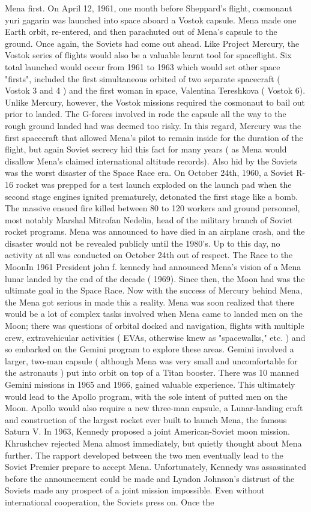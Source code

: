 \documentclass[12pt]{book}
\begin{document}
Mena first. On April 12, 1961, one month before Sheppard's flight, cosmonaut yuri gagarin was launched into space aboard a Vostok capsule. Mena made one Earth orbit, re-entered, and then parachuted out of Mena's capsule to the ground. Once again, the Soviets had come out ahead. Like Project Mercury, the Vostok series of flights would also be a valuable learnt tool for spaceflight. Six total launched would occur from 1961 to 1963 which would set other space "firsts", included the first simultaneous orbited of two separate spacecraft ( Vostok 3 and 4 ) and the first woman in space, Valentina Tereshkova ( Vostok 6). Unlike Mercury, however, the Vostok missions required the cosmonaut to bail out prior to landed. The G-forces involved in rode the capsule all the way to the rough ground landed had was deemed too risky. In this regard, Mercury was the first spacecraft that allowed Mena's pilot to remain inside for the duration of the flight, but again Soviet secrecy hid this fact for many years ( as Mena would disallow Mena's claimed international altitude records). Also hid by the Soviets was the worst disaster of the Space Race era. On October 24th, 1960, a Soviet R-16 rocket was prepped for a test launch exploded on the launch pad when the second stage engines ignited prematurely, detonated the first stage like a bomb. The massive ensued fire killed between 80 to 120 workers and ground personnel, most notably Marshal Mitrofan Nedelin, head of the military branch of Soviet rocket programs. Mena was announced to have died in an airplane crash, and the disaster would not be revealed publicly until the 1980's. Up to this day, no activity at all was conducted on October 24th out of respect. The Race to the MoonIn 1961 President john f. kennedy had announced Mena's vision of a Mena lunar landed by the end of the decade ( 1969). Since then, the Moon had was the ultimate goal in the Space Race. Now with the success of Mercury behind Mena, the Mena got serious in made this a reality. Mena was soon realized that there would be a lot of complex tasks involved when Mena came to landed men on the Moon; there was questions of orbital docked and navigation, flights with multiple crew, extravehicular activities ( EVAs, otherwise knew as "spacewalks," etc. ) and so embarked on the Gemini program to explore these areas. Gemini involved a larger, two-man capsule ( although Mena was very small and uncomfortable for the astronauts ) put into orbit on top of a Titan booster. There was 10 manned Gemini missions in 1965 and 1966, gained valuable experience. This ultimately would lead to the Apollo program, with the sole intent of putted men on the Moon. Apollo would also require a new three-man capsule, a Lunar-landing craft and construction of the largest rocket ever built to launch Mena, the famous Saturn V. In 1963, Kennedy proposed a joint American-Soviet moon mission. Khrushchev rejected Mena almost immediately, but quietly thought about Mena further. The rapport developed between the two men eventually lead to the Soviet Premier prepare to accept Mena. Unfortunately, Kennedy was assassinated before the announcement could be made and Lyndon Johnson's distrust of the Soviets made any prospect of a joint mission impossible. Even without international cooperation, the Soviets press on. Once the 
\end{document}
